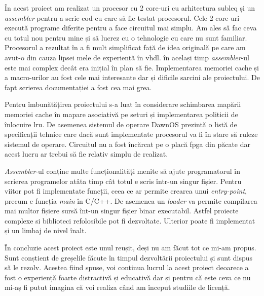 \documentclass[../main.tex]{subfiles}
\begin{document}
    În acest proiect am realizat un procesor cu 2 core-uri cu arhitectura \acrshort{subleq} și un
    \emph{assembler} pentru a scrie cod cu care să fie testat procesorul. Cele 2 core-uri execută
    programe diferite pentru a face circuitul mai simplu. Am ales să fac ceva cu totul nou pentru
    mine și să lucrez cu o tehnologie cu care nu sunt familiar. Procesorul a rezultat în a fi
    mult simplificat față de idea originală pe care am avut-o din cauza lipsei mele de experiență
    în \acrshort{vhdl}. în același timp \emph{assembler}-ul este mai complex decât era inițial în plan
    să fie. Implementarea memoriei cache și a macro-urilor au fost cele mai interesante dar și
    dificile sarcini ale proiectului. De fapt scrierea documentației a fost cea mai grea.

    Pentru îmbunătățirea proiectului s-a luat în considerare schimbarea mapării memoriei
    cache în mapare asociativă pe seturi și implementarea politicii de înlocuire \acrshort{lru}.
    De asemenea sistemul de operare DawnOS prezintă o listă de specificații tehnice care
    dacă sunt implementate procesorul va fi în stare să ruleze sistemul de operare. Circuitul nu a 
    fost încărcat pe o placă \acrshort{fpga} din păcate dar acest lucru ar trebui să fie relativ simplu
    de realizat.

    \emph{Assembler}-ul conține multe funcționalități menite să ajute programatorul în scrierea
    programelor atâta timp cât totul e scris într-un singur fișier. Pentru viitor pot fi
    implementate funcții, ceea ce ar permite crearea unui \emph{entry-point}, precum e
    funcția \emph{main} în C/C++. De asemenea un \emph{loader} va permite compilarea mai multor
    fișiere sursă înt-un singur fișier binar executabil. Astfel proiecte complexe si biblioteci
    refolosibile pot fi dezvoltate. Ulterior poate fi implementat și un limbaj de nivel
    înalt.

    În concluzie acest proiect este unul reușit, deși nu am făcut tot ce mi-am propus.
    Sunt conștient de greșelile făcute în timpul dezvoltării proiectului și sunt dispus să le rezolv.
    Acestea fiind spuse, voi continua lucrul la acest proiect deoarece a fost o experiență foarte
    distractivă și educativă dar și pentru că este ceva ce nu mi-aș fi putut imagina că voi
    realiza când am început studiile de licență.
\end{document}

